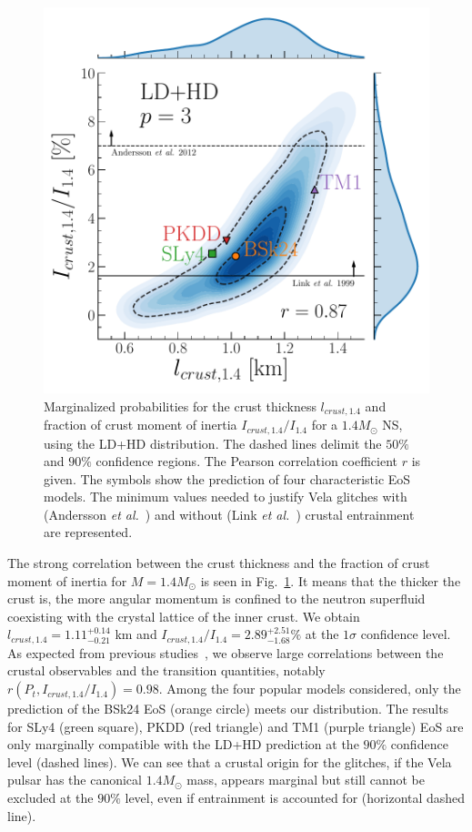 \begin{figure}[!t]
  \begin{center}
    \includegraphics[width=0.8\linewidth]{figures/ifrac14_vs_lcrust14.pdf}
  \end{center}
  \caption[Marginalized probabilities for the crust thickness and fraction of
  crust moment of inertia of a $1.4M_\odot$ neutron star]{Marginalized probabilities for the 
    crust thickness $l_{crust,1.4}$ and fraction of crust moment of inertia
    $I_{crust,1.4}/I_{1.4}$ for a $1.4M_\odot$ NS, using the LD+HD 
    distribution. The dashed lines delimit the $50\%$ and $90\%$ confidence 
    regions. The Pearson correlation coefficient $r$ is given. The symbols
    show the prediction of four characteristic EoS 
    models. The minimum values needed to justify Vela glitches with (Andersson 
    \textit{et al.}~\cite{Andersson2012}) and without (Link \textit{et
  al.}~\cite{Link1999}) crustal entrainment are 
represented.}\label{fig:ifrac14_vs_lcrust14}
\end{figure}

The strong correlation between the crust thickness and the fraction of crust 
moment of inertia for $M=1.4M_\odot$ is seen in
Fig.~\ref{fig:ifrac14_vs_lcrust14}. It means that the thicker the crust is, 
the more angular momentum is confined to the neutron superfluid coexisting with 
the crystal lattice of the inner crust. We obtain 
$l_{crust,1.4}=1.11_{-0.21}^{+0.14}$ km and $I_{crust,1.4}/I_{1.4}=
2.89_{-1.68}^{+2.51} \%$ at the $1\sigma$ confidence level. As expected from 
previous studies~\cite{Piekarewicz2014,Carreau2019moi}, we observe large 
correlations between the crustal observables and the transition quantities, 
notably $r(P_t,I_{crust,1.4}/I_{1.4})=0.98$. Among the four popular models 
considered, only the prediction of the BSk24 EoS (orange circle) meets our 
distribution. The results for SLy4 (green square), PKDD (red triangle) and TM1 
(purple triangle) EoS are only marginally compatible with the LD+HD prediction 
at the $90\%$ confidence level (dashed lines).
%
We can see that a crustal origin for the glitches, if the Vela pulsar has the
canonical $1.4M_\odot$ mass, appears marginal but still cannot be excluded at
the $90\%$ level, even if entrainment is accounted for (horizontal dashed
line).

